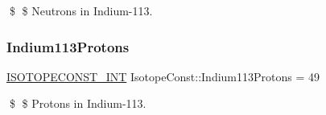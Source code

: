 \$ \$ Neutrons in Indium-\/113. \mbox{\label{group___isotope_const-_indium-_in113_ga8d3d4cc1ea44ed55dcb46f1f4edcc850}} 
\subsubsection{\texorpdfstring{Indium113\+Protons}{Indium113Protons}}
{\footnotesize\ttfamily \mbox{\hyperlink{group___isotope_const-_macros_ga5f18360b3e99483a35c32d789e62621c}{I\+S\+O\+T\+O\+P\+E\+C\+O\+N\+S\+T\+\_\+\+I\+NT}} Isotope\+Const\+::\+Indium113\+Protons = 49}

\$ \$ Protons in Indium-\/113. 